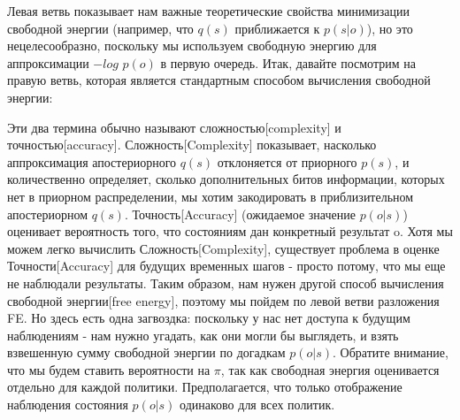 \documentclass[twoside,leqno, 11pt]{article}
\begin{document}
	Левая ветвь показывает нам важные теоретические свойства минимизации свободной энергии (например, что $q(s)$ приближается к $p(s|o)$), но это нецелесообразно, поскольку мы используем свободную энергию для аппроксимации $-log$ $p(o)$ в первую очередь. Итак, давайте посмотрим на правую ветвь, которая является стандартным способом вычисления свободной энергии:
	
	\begin{figure}[h]	
		\label{ris:image}
	\end{figure}
	
	Эти два термина обычно называют сложностью[complexity] и точностью[accuracy]. Сложность[Complexity] показывает, насколько аппроксимация апостериорного $q(s)$ отклоняется от приорного $p(s)$, и количественно определяет, сколько дополнительных битов информации, которых нет в приорном распределении, мы хотим закодировать в приблизительном апостериорном $q(s)$. Точность[Accuracy] (ожидаемое значение $p(o|s)$) оценивает вероятность того, что состояниям дан конкретный результат o. Хотя мы можем легко вычислить Сложность[Complexity], существует проблема в оценке Точности[Accuracy] для будущих временных шагов - просто потому, что мы еще не наблюдали результаты. Таким образом, нам нужен другой способ вычисления свободной энергии[free energy], поэтому мы пойдем по левой ветви разложения FE. Но здесь есть одна загвоздка: поскольку у нас нет доступа к будущим наблюдениям - нам нужно угадать, как они могли бы выглядеть, и взять взвешенную сумму свободной энергии по догадкам $p(o|s)$. Обратите внимание, что мы будем ставить вероятности на $\pi$, так как свободная энергия оценивается отдельно для каждой политики. Предполагается, что только отображение наблюдения состояния $p(o|s)$ одинаково для всех политик.
	
	\begin{figure}[h]	
		\label{ris:image}
	\end{figure}
	
\end{document}
